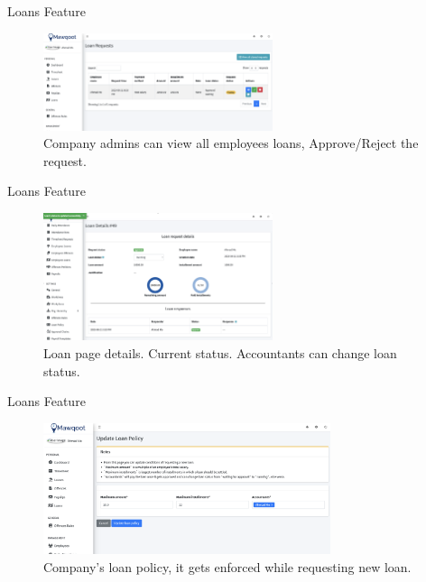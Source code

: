 \documentclass{loyola-beamer}
\begin{document}
\begin{frame}{Loans Feature}
	\begin{figure}
		\begin{center}
			\includegraphics[width=0.6\textwidth]{figures/employees-loans.png}
		\end{center}
		\caption{Company admins can view all employees loans, Approve/Reject the request.}
	\end{figure}
\end{frame}

\begin{frame}{Loans Feature}
	\begin{figure}
		\begin{center}
			\includegraphics[width=0.6\textwidth]{figures/loan-details.png}
		\end{center}
		\caption{Loan page details. Current status. Accountants can change loan status.}
	\end{figure}
\end{frame}

\begin{frame}{Loans Feature}
	\begin{figure}
		\begin{center}
			\includegraphics[width=0.75\textwidth]{figures/loan-policy.png}
		\end{center}
		\caption{Company's loan policy, it gets enforced while requesting new loan.}
	\end{figure}
\end{frame}
\end{document}

